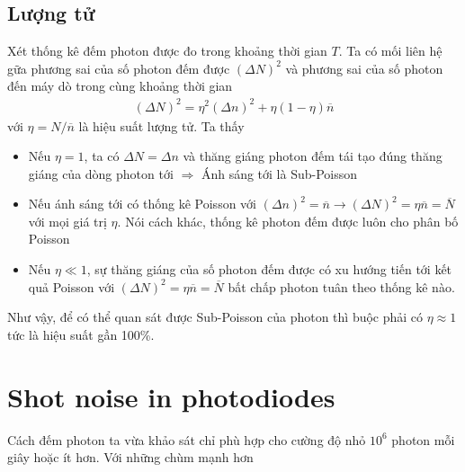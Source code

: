 \documentclass{report}
\begin{document}
\subsection{Lượng tử}
Xét thống kê đếm photon được đo trong khoảng thời gian $T$. Ta có mối liên hệ gữa phương sai của số photon đếm được $(\Delta N)^{2}$ và phương sai của số photon đến máy dò trong cùng khoảng thời gian
\begin{gather}
	(\Delta N)^{2} = \eta^{2} (\Delta n)^{2} + \eta(1-\eta) \overline{n}
\end{gather}
với $\eta = N / \overline{n}$ là hiệu suất lượng tử.
Ta thấy
\begin{itemize}
	\item Nếu $\eta = 1$, ta có $\Delta N = \Delta n$ và thăng giáng photon đếm tái tạo đúng thăng giáng của dòng photon tới $\Rightarrow$ Ánh sáng tới là Sub-Poisson 
	\item  Nếu ánh sáng tới có thống kê Poisson với $(\Delta n)^{2} = \overline{n} \rightarrow (\Delta N)^{2} = \eta \overline{n} = \overline{N}$ với mọi giá trị $\eta$. Nói cách khác, thống kê photon đếm được luôn cho phân bố Poisson\\
	\item  Nếu $\eta \ll 1$, sự thăng giáng của số photon đếm được có xu hướng tiến tới kết quả Poisson với $(\Delta N)^{2} = \eta \overline{n} = \overline{N}$ bất chấp photon tuân theo thống kê nào. 
\end{itemize}
Như vậy, để có thể quan sát được Sub-Poisson của photon thì buộc phải có $\eta \approx 1$ tức là hiệu suất gần 100\%.
\section{Shot noise in photodiodes}
Cách đếm photon ta vừa khảo sát chỉ phù hợp cho cường độ nhỏ $10^{6}$ photon mỗi giây hoặc ít hơn. Với những chùm mạnh hơn
\end{document}
